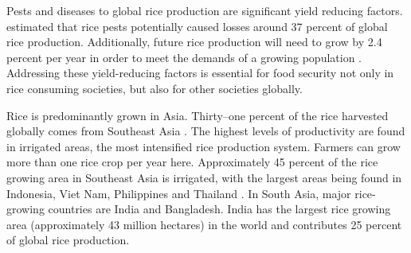 ﻿%

Pests and diseases to global rice production are significant yield reducing factors.  estimated that rice pests potentially caused losses around 37 percent of global rice production. Additionally, future rice production will need to grow by 2.4 percent per year in order to meet the demands of a growing population . Addressing these yield-reducing factors is essential for food security not only in rice consuming societies, but also for other societies globally.

Rice is predominantly grown in Asia. Thirty--one percent of the rice harvested globally comes from Southeast Asia . The highest levels of productivity are found in irrigated areas, the most intensified rice production system. Farmers can grow more than one rice crop per year here. Approximately 45 percent of the rice growing area in Southeast Asia is irrigated, with the largest areas being found in Indonesia, Viet Nam, Philippines and Thailand . In South Asia, major rice-growing countries are India and Bangladesh. India has the largest rice growing area (approximately 43 million hectares) in the world and contributes 25 percent of global rice production. 


%
% 
%

